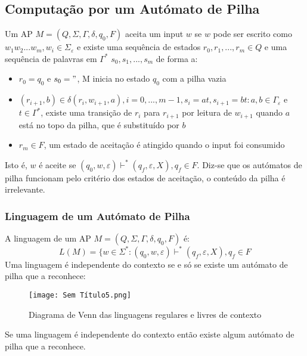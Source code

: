 \documentclass[10pt,a4paper]{report}
\begin{document}
\subsection{Computação por um Autómato de Pilha}
Um AP $M = (Q, \Sigma, \Gamma, \delta, q_0, F)$ aceita um input $w$ se $w$ pode ser escrito como $w_1w_2...w_m,w_i \in \Sigma_\varepsilon$ e existe uma sequência de estados $r_0,r_1,...,r_m \in Q$ e uma sequência de palavras em $\Gamma^*$ $s_0,s_1,...,s_m$ de forma a:
\begin{itemize}
\item $r_0 = q_0$ e $s_0 = "$, M inicia no estado $q_0$ com a pilha vazia
\item $(r_{i+1},b) \in \delta(r_i,w_{i+1},a), i=0,...,m-1, s_i = at, s_{i+1} = bt: a, b \in \Gamma_\varepsilon$ e $t\in \Gamma^*$, existe uma transição de $r_i$ para $r_{i+1}$ por leitura de $w_{i+1}$ quando $a$ está no topo da pilha, que é substituído por $b$
\item $r_m \in F$, um estado de aceitação é atingido quando o input foi consumido
\end{itemize}
Isto é, $w$ é aceite se $(q_0,w,\varepsilon) \vdash^* (q_f,\varepsilon,X), q_f \in F$. Diz-se que os autómatos de pilha funcionam pelo critério dos estados de aceitação, o conteúdo da pilha é irrelevante.
\subsubsection{Linguagem de um Autómato de Pilha}
A linguagem de um AP $M = (Q, \Sigma, \Gamma, \delta, q_0, F)$ é:
$$
L(M) = \{ w \in \Sigma^* : (q_0,w,\varepsilon) \vdash^* (q_f,\varepsilon, X), q_f \in F
$$
Uma linguagem é independente do contexto se e só se existe um autómato de pilha que a reconhece:
\begin{figure}[H]
\centering
\texttt{[image: Sem Título5.png]}
\caption{Diagrama de Venn das linguagens regulares e livres de contexto}
\end{figure}
Se uma linguagem é independente do contexto então existe algum autómato de pilha que a reconhece.
\end{document}
